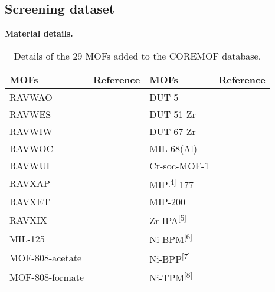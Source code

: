 \subsection{Screening dataset}\label{si-screening-dataset}

\textbf{Material details.}

\begin{table}[H]
    \centering
    \caption{%
        Details of the 29 MOFs added to the COREMOF database.
    }\label{tbl:extra-mofs}
    \begin{tabular}{@{}llll@{}}
        MOFs & Reference & MOFs & Reference\\
        \midrule
        RAVWAO & \citep{gulcayBiocompatibleMOFsStorage2019} & 
        DUT-5 & \citep{senkovskaNewHighlyPorous2009} \\
        RAVWES & \citep{gulcayBiocompatibleMOFsStorage2019} &
        DUT-51-Zr & \citep{bonZrIvHf2012}\\
        RAVWIW & \citep{gulcayBiocompatibleMOFsStorage2019} &
        DUT-67-Zr & \citep{bonZrHfBasedMetal2013}\\
        RAVWOC & \citep{gulcayBiocompatibleMOFsStorage2019} &
        MIL-68(Al) & \citep{yangProbingAdsorptionPerformance2012}\\
        RAVWUI & \citep{gulcayBiocompatibleMOFsStorage2019} &
        Cr-soc-MOF-1 & \citep{nandiRevisitingWaterSorption2019}\\
        RAVXAP & \citep{gulcayBiocompatibleMOFsStorage2019} &
        MIP\textsuperscript{{[}4{]}}-177 & \citep{wangPhaseTransformableUltrastable2018} \\
        RAVXET & \citep{gulcayBiocompatibleMOFsStorage2019} &
        MIP-200 & \citep{wangRobustLargeporeZirconium2018} \\
        RAVXIX & \citep{gulcayBiocompatibleMOFsStorage2019} &
        Zr-IPA\textsuperscript{{[}5{]}} & \citep{wangMesoporousZirconiumIsophthalateMultifunctional2020} \\
        MIL-125 & \citep{soaresComputationalEvaluationChemical2019} &
        Ni-BPM\textsuperscript{{[}6{]}} & \citep{zhengMolecularInsightFluorocarbon2020}\\
        MOF-808-acetate & \citep{soaresComputationalEvaluationChemical2019} &
        Ni-BPP\textsuperscript{{[}7{]}} & \citep{zhengMolecularInsightFluorocarbon2020}\\
        MOF-808-formate & \citep{soaresComputationalEvaluationChemical2019} &
        Ni-TPM\textsuperscript{{[}8{]}} & \citep{zhengMolecularInsightFluorocarbon2020}\\

\end{tabular}
\end{table}
